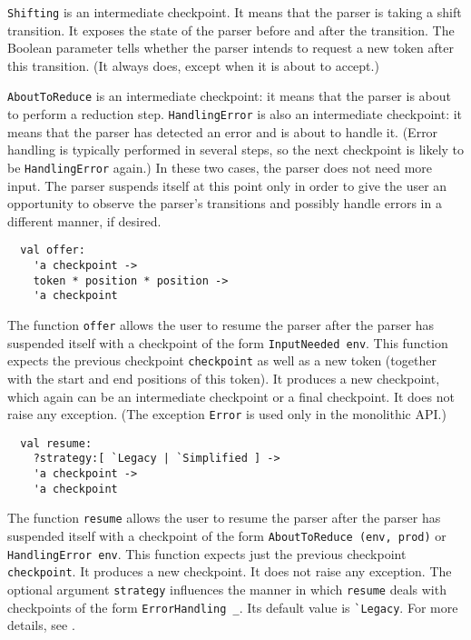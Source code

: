 \documentclass[onecolumn,11pt,nocopyrightspace,preprint]{sigplanconf}
\begin{document}
\verb+Shifting+ is an intermediate checkpoint. It means that the parser is taking
a shift transition. It exposes the state of the parser before and after the
transition. The Boolean parameter tells whether the parser intends to request
a new token after this transition. (It always does, except when it is about to
accept.)

\verb+AboutToReduce+ is an intermediate checkpoint: it means that the parser is
about to perform a reduction step. \verb+HandlingError+ is also an
intermediate checkpoint: it means that the parser has detected an error and is
about to handle it. (Error handling is typically performed in several steps,
so the next checkpoint is likely to be \verb+HandlingError+ again.) In these two
cases, the parser does not need more input. The parser suspends itself at this
point only in order to give the user an opportunity to observe the parser's
transitions and possibly handle errors in a different manner, if desired.


\begin{verbatim}
  val offer:
    'a checkpoint ->
    token * position * position ->
    'a checkpoint
\end{verbatim}

The function \verb+offer+ allows the user to resume the parser after the
parser has suspended itself with a checkpoint of the form \verb+InputNeeded env+.
This function expects the previous checkpoint \verb+checkpoint+ as well as a new token
(together with the start and end positions of this token). It produces a new
checkpoint, which again can be an intermediate checkpoint or a final checkpoint. It does
not raise any exception. (The exception \texttt{Error} is used only in the
monolithic API.)


\begin{verbatim}
  val resume:
    ?strategy:[ `Legacy | `Simplified ] ->
    'a checkpoint ->
    'a checkpoint
\end{verbatim}

The function \verb+resume+ allows the user to resume the parser after the
parser has suspended itself with a checkpoint of the form
\verb+AboutToReduce (env, prod)+ or \verb+HandlingError env+.
This function expects just the previous checkpoint \verb+checkpoint+. It produces a new
checkpoint. It does not raise any exception.
%
The optional argument \verb+strategy+ influences the manner in which
\verb+resume+ deals with checkpoints of the form \verb+ErrorHandling _+. Its
default value is \verb+`Legacy+. For more details, see .
\end{document}
